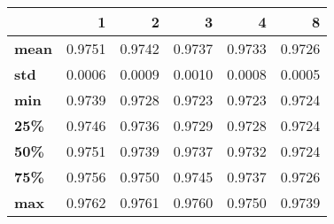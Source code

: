 \begin{tabular}{lrrrrr}
\toprule
{} &       1 &       2 &       3 &       4 &       8 \\
\midrule
\textbf{mean} &  0.9751 &  0.9742 &  0.9737 &  0.9733 &  0.9726 \\
\textbf{std } &  0.0006 &  0.0009 &  0.0010 &  0.0008 &  0.0005 \\
\textbf{min } &  0.9739 &  0.9728 &  0.9723 &  0.9723 &  0.9724 \\
\textbf{25\% } &  0.9746 &  0.9736 &  0.9729 &  0.9728 &  0.9724 \\
\textbf{50\% } &  0.9751 &  0.9739 &  0.9737 &  0.9732 &  0.9724 \\
\textbf{75\% } &  0.9756 &  0.9750 &  0.9745 &  0.9737 &  0.9726 \\
\textbf{max } &  0.9762 &  0.9761 &  0.9760 &  0.9750 &  0.9739 \\
\bottomrule
\end{tabular}
